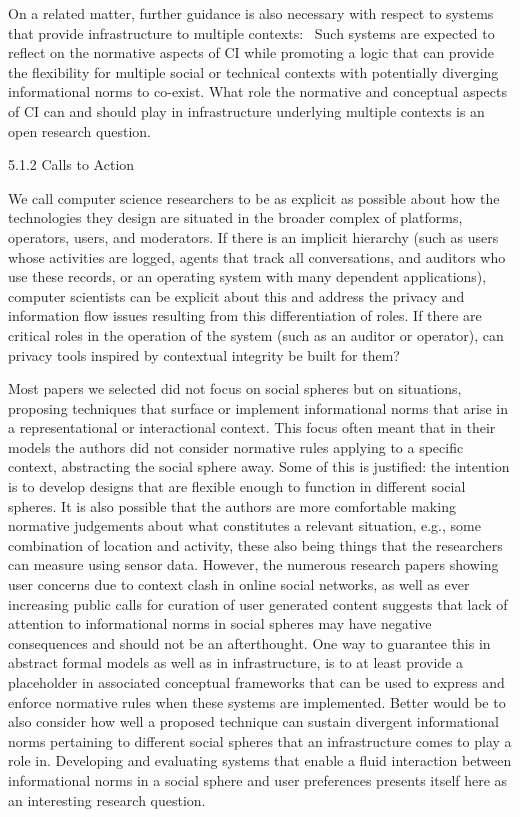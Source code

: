 \documentclass[../thesis.tex]{subfiles}
\begin{document}
\bigskip

On a related matter, further guidance is also necessary with respect to
systems that provide infrastructure to multiple contexts: \ Such
systems are expected to reflect on the normative aspects of CI while
promoting a logic that can provide the flexibility for multiple social
or technical contexts with potentially diverging informational norms to
co-exist. What role the normative and conceptual aspects of CI can and
should play in infrastructure underlying multiple contexts is an open
research question.


\bigskip

{\color[rgb]{0.2627451,0.2627451,0.2627451}
5.1.2 Calls to Action}

We call computer science researchers to be as explicit as possible about
how the technologies they design are situated in the broader complex of
platforms, operators, users, and moderators. If there is an implicit
hierarchy (such as users whose activities are logged, agents that track
all conversations, and auditors who use these records, or an operating
system with many dependent applications), computer scientists can be
explicit about this and address the privacy and information flow issues
resulting from this differentiation of roles. If there are critical
roles in the operation of the system (such as an auditor or operator),
can privacy tools inspired by contextual integrity be built for them?

Most papers we selected did not focus on social spheres but on
situations, proposing techniques that surface or implement
informational norms that arise in a representational or interactional
context. This focus often meant that in their models the authors did
not consider normative rules applying to a specific context,
abstracting the social sphere away. Some of this is justified: the
intention is to develop designs that are flexible enough to function in
different social spheres. It is also possible that the authors are more
comfortable making normative judgements about what constitutes a
relevant situation, e.g., some combination of location and activity,
these also being things that the researchers can measure using sensor
data. However, the numerous research papers showing user concerns due
to context clash in online social networks, as well as ever increasing
public calls for curation of user generated content suggests that lack
of attention to informational norms in social spheres may have negative
consequences and should not be an afterthought. One way to guarantee
this in abstract formal models as well as in infrastructure, is to at
least provide a placeholder in associated conceptual frameworks that
can be used to express and enforce normative rules when these systems
are implemented. Better would be to also consider how well a proposed
technique can sustain divergent informational norms pertaining to
different social spheres that an infrastructure comes to play a role
in. Developing and evaluating systems that enable a fluid interaction
between informational norms in a social sphere and user preferences
presents itself here as an interesting research question.
\end{document}
